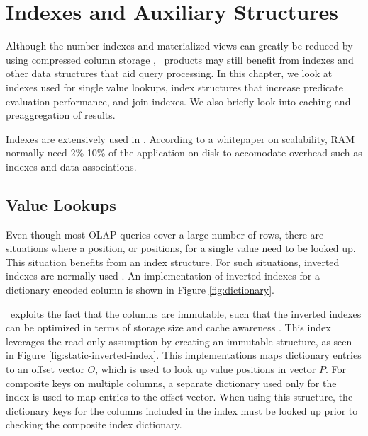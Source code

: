 \chapter{Indexes and Auxiliary Structures}
\label{chap:Indexes and Auxiliary Structures}
Although the number indexes and materialized views can greatly be reduced by using compressed column storage \cite{Lahiri2015-mz}, \bd~products may still benefit from indexes and other data structures that aid query processing. In this chapter, we look at indexes used for single value lookups, index structures that increase predicate evaluation performance, and join indexes. We also briefly look into caching and preaggregation of results.

Indexes are extensively used in \qlikview. According to a whitepaper on scalability, RAM normally need 2\%-10\% of the application on disk to accomodate overhead such as indexes and data associations.

\newpage

\section{Value Lookups}
\label{sec:Value Lookups}
Even though most OLAP queries cover a large number of rows, there are situations where a position, or positions, for a single value need to be looked up. This situation benefits from an index structure. For such situations, inverted indexes are normally used \cite{Lemke2010-is}. An implementation of inverted indexes for a dictionary encoded column is shown in Figure \ref{fig:dictionary}. 

\hyrise~exploits the fact that the columns are immutable, such that the inverted indexes can be optimized in terms of storage size and cache awareness \cite{Schwalb2014-hn}. This index leverages the read-only assumption by creating an immutable structure, as seen in Figure \ref{fig:static-inverted-index}. This implementations  maps dictionary entries to an offset vector $O$, which is used to look up value positions in vector $P$. For composite keys on multiple columns, a separate dictionary used only for the index is used to map entries to the offset vector. When using this structure, the dictionary keys for the columns included in the index must be looked up prior to checking the composite index dictionary.

